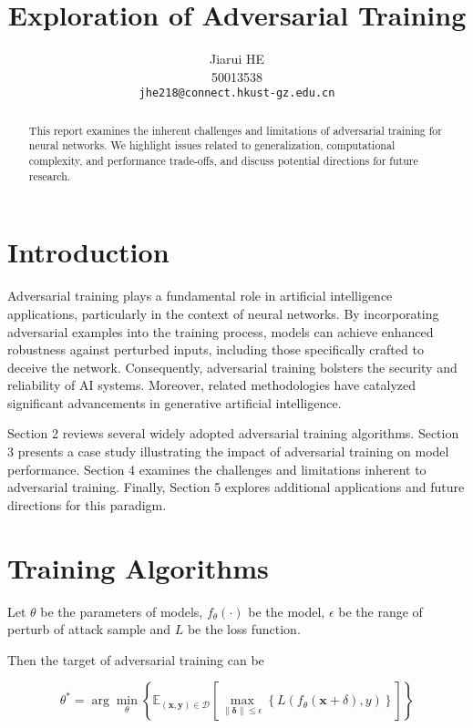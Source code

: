\documentclass[10pt,twocolumn,letterpaper]{article}
\title{Exploration of Adversarial Training}
\author{Jiarui HE\\
50013538 \\
{\tt\small jhe218@connect.hkust-gz.edu.cn}
}
\begin{document}
\maketitle

\begin{abstract}
This report examines the inherent challenges and limitations of adversarial training for neural networks. We highlight issues related to generalization, computational complexity, and performance trade-offs, and discuss potential directions for future research.
\end{abstract}

\section{Introduction}

Adversarial training plays a fundamental role in artificial intelligence applications, particularly in the context of neural networks. By incorporating adversarial examples into the training process, models can achieve enhanced robustness against perturbed inputs, including those specifically crafted to deceive the network. Consequently, adversarial training bolsters the security and reliability of AI systems. Moreover, related methodologies have catalyzed significant advancements in generative artificial intelligence.

Section 2 reviews several widely adopted adversarial training algorithms. Section 3 presents a case study illustrating the impact of adversarial training on model performance. Section 4 examines the challenges and limitations inherent to adversarial training. Finally, Section 5 explores additional applications and future directions for this paradigm.

\section{Training Algorithms}
Let $\theta$ be the parameters of models, $f_\theta(\cdot)$ be the model, $\epsilon$ be the range of perturb of attack sample and $L$ be the loss function.

Then the target of adversarial training can be

\begin{equation}
\theta^*=\arg\min_\theta\left\{
  \mathbb{E}_{(\mathbf{x}, \mathbf{y})\in \mathcal{D}}
  \left[
      \max_{\lVert\mathbf{\delta}\rVert\leq \epsilon}
          \left\{L(f_\theta(\mathbf{x}+\delta), y)\right\}
  \right]
\right\}
\tag{2:1}
\label{formula:adversarial_target}
\end{equation}
\end{document}
